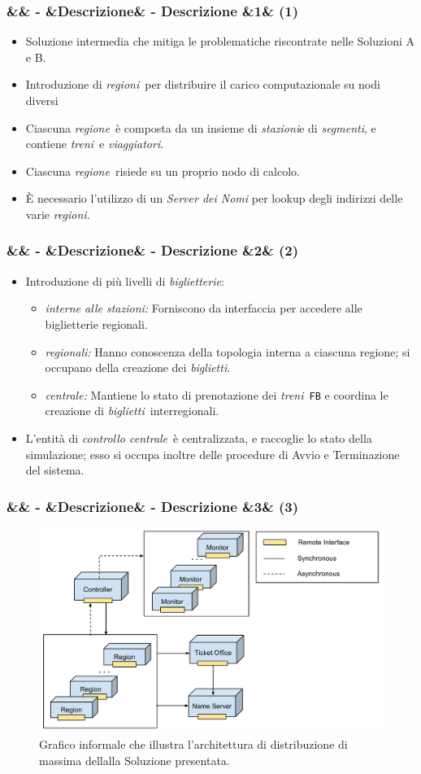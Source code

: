 \documentclass[slidestop,compress,blackandwhite]{beamer}
\newcommand{\ttt}[1]{\texttt{#1}}
\newcommand{\ii}[1]{\textit{#1}}
\newcommand{\treni}{\ii{treni}}
\newcommand{\viaggiatori}{\ii{viaggiatori}}
\newcommand{\stazioni}{\ii{stazioni}}
\newcommand{\tickets}{\ii{biglietti}}
\newcommand{\segmenti}{\ii{segmenti}}
\newcommand{\biglietterie}{\ii{biglietterie}}
\newcommand{\controller}{\ii{controllo centrale}}
\newcommand{\regione}{\ii{regione}}
\newcommand{\regioni}{\ii{regioni}}
\newcommand{\newtitle}[4]{
	#1 
	\ifx&#2&%
	\else
  		\large- #2
	\fi
	\ifx&#3&%
	\else
  		\normalsize- #3
	\fi
	\ifx&#4&%
	\else
  		\normalsize (#4)
	\fi
}
\newcommand{\newframe}[5]{
	\begin{frame}
		\frametitle{\newtitle{#1}{#2}{#3}{#4}}
		#5
	\end{frame}
}
\newcommand{\myitemize}[1]{\begin{itemize}#1\end{itemize}}
\begin{document}
	\newframe{}{}{Descrizione}{1}{
		\vspace{0.5cm}
		\begin{itemize}
			\item Soluzione intermedia che mitiga le problematiche riscontrate nelle Soluzioni A e B.
			\item Introduzione di \regioni~per distribuire il carico computazionale su nodi diversi
			\item Ciascuna \regione~è composta da un insieme di \stazioni e di \segmenti, e contiene \treni~e \viaggiatori.
			\item Ciascuna \regione~risiede su un proprio nodo di calcolo.
			\item \`E necessario l'utilizzo di un \ii{Server dei Nomi} per lookup degli indirizzi delle varie \regioni.
		\end{itemize}
	
	}
	
	\newframe{}{}{Descrizione}{2}{
		\vspace{0.5cm}
		\myitemize{
			\item Introduzione di più livelli di \biglietterie:
				\myitemize{
					\item \ii{interne alle stazioni:} Forniscono da interfaccia per accedere alle biglietterie regionali.
					\item \ii{regionali:} Hanno conoscenza della topologia interna a ciascuna regione; si occupano della creazione dei \tickets.
					\item \ii{centrale:} Mantiene lo stato di prenotazione dei \treni~\ttt{FB} e coordina le creazione di \tickets~interregionali.
				}
			\item L'entità di \controller~è centralizzata, e raccoglie lo stato della simulazione; esso si occupa inoltre delle procedure di Avvio e Terminazione del sistema.
		}
	}
	
	\newframe{}{}{Descrizione}{3}{
	\begin{figure}
			\includegraphics[scale=0.28,trim=0mm 0mm 0mm 20mm]{imgs/solution.pdf}
			\caption{\small Grafico informale che illustra l'architettura di distribuzione di massima dellalla Soluzione presentata.}
		\end{figure}
	}
	
\end{document}
